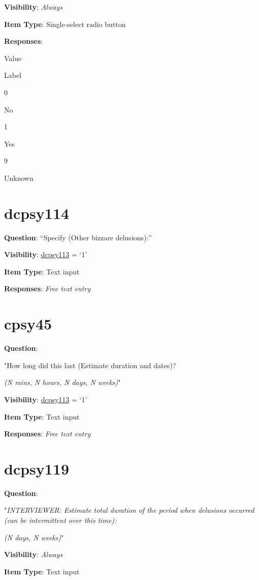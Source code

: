 \documentclass[]{book}
\begin{document}
\textbf{Visibility}: \emph{Always}

\textbf{Item Type}: Single-select radio button

\textbf{Responses}:

Value

Label

0

No

1

Yes

9

Unknown

\hypertarget{dcpsy114}{%
\section{dcpsy114}\label{dcpsy114}}

\textbf{Question}: ``Specify (Other bizzare delusions):''

\textbf{Visibility}: \protect\hyperlink{dcpsy113}{dcpsy113} = `1'

\textbf{Item Type}: Text input

\textbf{Responses}: \emph{Free text entry}

\hypertarget{cpsy45}{%
\section{cpsy45}\label{cpsy45}}

\textbf{Question}:

"How long did this last (Estimate duration and dates)?

\emph{(N mins, N hours, N days, N weeks)}"

\textbf{Visibility}: \protect\hyperlink{dcpsy113}{dcpsy113} = `1'

\textbf{Item Type}: Text input

\textbf{Responses}: \emph{Free text entry}

\hypertarget{dcpsy119}{%
\section{dcpsy119}\label{dcpsy119}}

\textbf{Question}:

"\emph{INTERVIEWER: Estimate total duration of the period when delusions occurred (can be intermittent over this time):}

\emph{(N days, N weeks)}"

\textbf{Visibility}: \emph{Always}

\textbf{Item Type}: Text input
\end{document}
